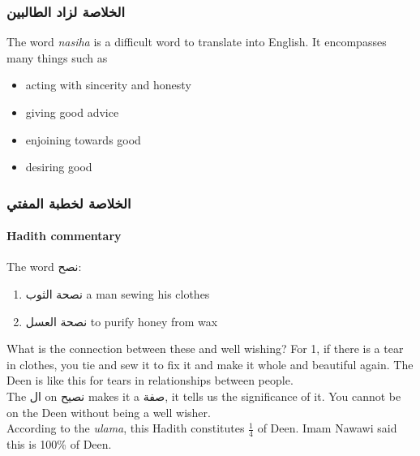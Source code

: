 \documentclass[
]{book}
\providecommand{\tightlist}{%
  \setlength{\itemsep}{0pt}\setlength{\parskip}{0pt}}
\begin{document}
\hypertarget{ux627ux644ux62eux644ux627ux635ux629-ux644ux632ux627ux62f-ux627ux644ux637ux627ux644ux628ux64aux646}{%
\subsubsection{الخلاصة لزاد الطالبين}\label{ux627ux644ux62eux644ux627ux635ux629-ux644ux632ux627ux62f-ux627ux644ux637ux627ux644ux628ux64aux646}}

The word \emph{nasiha} is a difficult word to translate into English. It encompasses many things such as

\begin{itemize}
\tightlist
\item
  acting with sincerity and honesty
\item
  giving good advice
\item
  enjoining towards good
\item
  desiring good
\end{itemize}

\hypertarget{ux627ux644ux62eux644ux627ux635ux629-ux644ux62eux637ux628ux629-ux627ux644ux645ux641ux62aux64a}{%
\subsubsection{الخلاصة لخطبة المفتي}\label{ux627ux644ux62eux644ux627ux635ux629-ux644ux62eux637ux628ux629-ux627ux644ux645ux641ux62aux64a}}

\hypertarget{hadith-commentary}{%
\paragraph{Hadith commentary}\label{hadith-commentary}}

The word نصح:

\begin{enumerate}
\def\labelenumi{\arabic{enumi}.}
\tightlist
\item
  نصحة الثوب a man sewing his clothes
\item
  نصحة العسل to purify honey from wax
\end{enumerate}

What is the connection between these and well wishing? For 1, if there is a tear in clothes, you tie and sew it to fix it and make it whole and beautiful again. The Deen is like this for tears in relationships between people.\\
The ال on نصيح makes it a صفة, it tells us the significance of it. You cannot be on the Deen without being a well wisher.\\
According to the \emph{ulama}, this Hadith constitutes \(\frac{1}{4}\) of Deen. Imam Nawawi said this is 100\% of Deen.
\end{document}
